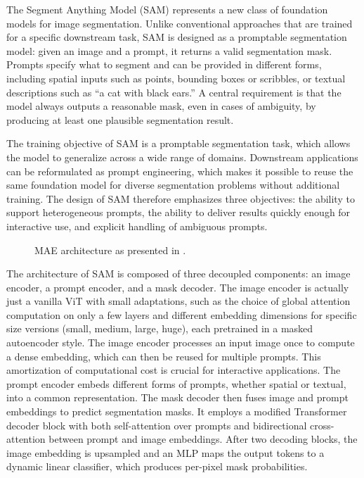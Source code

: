 The Segment Anything Model (SAM) represents a new class of foundation models for image segmentation. Unlike conventional approaches that are trained for a specific downstream task, SAM is designed as a promptable segmentation model: given an image and a prompt, it returns a valid segmentation mask. Prompts specify what to segment and can be provided in different forms, including spatial inputs such as points, bounding boxes or scribbles, or textual descriptions such as “a cat with black ears.” A central requirement is that the model always outputs a reasonable mask, even in cases of ambiguity, by producing at least one plausible segmentation result. 

The training objective of SAM is a promptable segmentation task, which allows the model to generalize across a wide range of domains. Downstream applications can be reformulated as prompt engineering, which makes it possible to reuse the same foundation model for diverse segmentation problems without additional training. The design of SAM therefore emphasizes three objectives: the ability to support heterogeneous prompts, the ability to deliver results quickly enough for interactive use, and explicit handling of ambiguous prompts. 

\begin{figure}[!ht]
    \centering
    \caption{MAE architecture as presented in \cite{LeCun.1989}.}
    \label{fig:SAM1}
\end{figure}

The architecture of SAM is composed of three decoupled components: an image encoder, a prompt encoder, and a mask decoder. The image encoder is actually just a vanilla ViT with small adaptations, such as the choice of global attention computation on only a few layers and different embedding dimensions for specific size versions (small, medium, large, huge), each pretrained in a masked autoencoder style. The image encoder processes an input image once to compute a dense embedding, which can then be reused for multiple prompts. This amortization of computational cost is crucial for interactive applications. The prompt encoder embeds different forms of prompts, whether spatial or textual, into a common representation. The mask decoder then fuses image and prompt embeddings to predict segmentation masks. It employs a modified Transformer decoder block with both self-attention over prompts and bidirectional cross-attention between prompt and image embeddings. After two decoding blocks, the image embedding is upsampled and an MLP maps the output tokens to a dynamic linear classifier, which produces per-pixel mask probabilities. 

